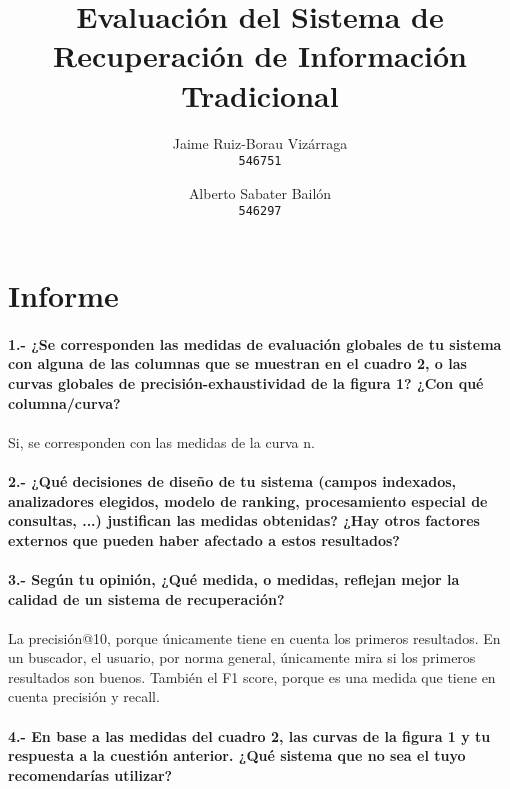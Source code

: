 \documentclass[a4paper]{article}
\begin{document}
\title{Evaluación del Sistema de Recuperación de Información Tradicional}
\author{
	Jaime Ruiz-Borau Vizárraga\\
	\texttt{546751}
	\and
	Alberto Sabater Bailón\\
	\texttt{546297}
	}
\date{}
\maketitle
\section{Informe}
\paragraph{1.- ¿Se corresponden las medidas de evaluación globales de tu sistema con alguna de las columnas que se muestran en el cuadro 2, o las curvas globales de precisión-exhaustividad de la figura 1? ¿Con qué columna/curva?}
\paragraph{}Si, se corresponden con las medidas de la curva n.
\paragraph{2.- ¿Qué decisiones de diseño de tu sistema (campos indexados, analizadores elegidos, modelo de ranking, procesamiento especial de consultas, ...) justifican las medidas obtenidas? ¿Hay otros factores externos que pueden haber afectado a estos resultados?}
\paragraph{}
\paragraph{3.- Según tu opinión, ¿Qué medida, o medidas, reflejan mejor la calidad de un sistema de recuperación?}
\paragraph{}La precisión@10, porque únicamente tiene en cuenta los primeros resultados. En un buscador, el usuario, por norma general, únicamente mira si los primeros resultados son buenos.
También el F1 score, porque es una medida que tiene en cuenta precisión y recall.
\paragraph{4.- En base a las medidas del cuadro 2, las curvas de la figura 1 y tu respuesta a la cuestión anterior. ¿Qué sistema que no sea el tuyo recomendarías utilizar?}
\paragraph{}
\end{document}
